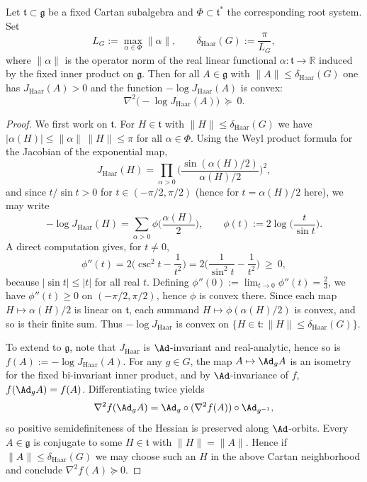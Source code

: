 \begin{lemma}\label{lem:haar_convex}
Let $\mathfrak t\subset\mathfrak g$ be a fixed Cartan subalgebra and $\Phi\subset\mathfrak t^{\ast}$ the corresponding root system.
Set
\[
L_G:=\max_{\alpha\in\Phi}\|\alpha\|,
\qquad
\delta_{\mathrm{Haar}}(G):=\frac{\pi}{L_G},
\]
where $\|\alpha\|$ is the operator norm of the real linear functional $\alpha:\mathfrak t\to\mathbb R$ induced by the fixed inner product on $\mathfrak g$.
Then for all $A\in\mathfrak g$ with $\|A\|\le \delta_{\mathrm{Haar}}(G)$ one has $J_{\mathrm{Haar}}(A)>0$ and the function $-\log J_{\mathrm{Haar}}(A)$ is convex:
\[
\nabla^2\big(-\log J_{\mathrm{Haar}}(A)\big)\ \succeq\ 0.
\]
\end{lemma}

\begin{proof}
We first work on $\mathfrak t$. For $H\in\mathfrak t$ with $\|H\|\le \delta_{\mathrm{Haar}}(G)$ we have $|\alpha(H)|\le \|\alpha\|\,\|H\|\le \pi$ for all $\alpha\in\Phi$.
Using the Weyl product formula for the Jacobian of the exponential map,
\[
J_{\mathrm{Haar}}(H)=\prod_{\alpha>0}\Big(\frac{\sin(\alpha(H)/2)}{\alpha(H)/2}\Big)^2,
\]
and since $t/\sin t>0$ for $t\in(-\pi/2,\pi/2)$ (hence for $t=\alpha(H)/2$ here), we may write
\[
-\log J_{\mathrm{Haar}}(H)=\sum_{\alpha>0}\phi\!\Big(\frac{\alpha(H)}{2}\Big),
\qquad
\phi(t):=2\log\Big(\frac{t}{\sin t}\Big).
\]
A direct computation gives, for $t\neq 0$,
\[
\phi''(t)=2\Big(\csc^2 t-\frac{1}{t^2}\Big)=2\Big(\frac{1}{\sin^2 t}-\frac{1}{t^2}\Big)\ \ge\ 0,
\]
because $|\sin t|\le |t|$ for all real $t$.
Defining $\phi''(0):=\lim_{t\to 0}\phi''(t)=\tfrac{2}{3}$, we have $\phi''(t)\ge 0$ on $(-\pi/2,\pi/2)$, hence $\phi$ is convex there.
Since each map $H\mapsto \alpha(H)/2$ is linear on $\mathfrak t$, each summand $H\mapsto \phi(\alpha(H)/2)$ is convex, and so is their finite sum.
Thus $-\log J_{\mathrm{Haar}}$ is convex on $\{H\in\mathfrak t:\|H\|\le \delta_{\mathrm{Haar}}(G)\}$.

To extend to $\mathfrak g$, note that $J_{\mathrm{Haar}}$ is $\Ad$-invariant and real-analytic, hence so is $f(A):=-\log J_{\mathrm{Haar}}(A)$.
For any $g\in G$, the map $A\mapsto \Ad_g A$ is an isometry for the fixed bi-invariant inner product, and by $\Ad$-invariance of $f$,
$f(\Ad_g A)=f(A)$.
Differentiating twice yields
\[
\nabla^2 f(\Ad_g A)=\Ad_g\circ (\nabla^2 f(A))\circ \Ad_{g^{-1}},
\]
so positive semidefiniteness of the Hessian is preserved along $\Ad$-orbits.
Every $A\in\mathfrak g$ is conjugate to some $H\in\mathfrak t$ with $\|H\|=\|A\|$.
Hence if $\|A\|\le \delta_{\mathrm{Haar}}(G)$ we may choose such an $H$ in the above Cartan neighborhood and conclude $\nabla^2 f(A)\succeq 0$.
\end{proof}


